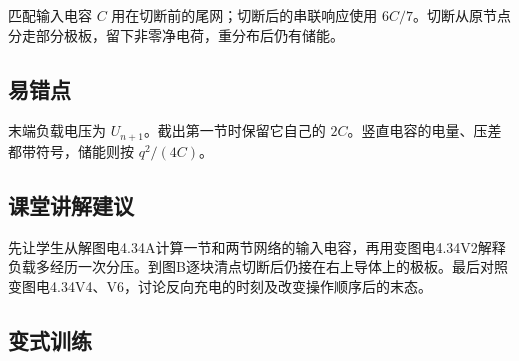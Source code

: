 \documentclass[UTF8,fontset=fandol,a4paper,11pt]{ctexart}
\begin{document}
匹配输入电容 $C$ 用在切断前的尾网；切断后的串联响应使用 $6C/7$。切断从原节点分走部分极板，留下非零净电荷，重分布后仍有储能。



\subsection*{易错点}

末端负载电压为 $U_{n+1}$。截出第一节时保留它自己的 $2C$。竖直电容的电量、压差都带符号，储能则按 $q^2/(4C)$。



\subsection*{课堂讲解建议}

先让学生从解图电4.34A计算一节和两节网络的输入电容，再用变图电4.34V2解释负载多经历一次分压。到图B逐块清点切断后仍接在右上导体上的极板。最后对照变图电4.34V4、V6，讨论反向充电的时刻及改变操作顺序后的末态。


\subsection*{变式训练}
\end{document}
